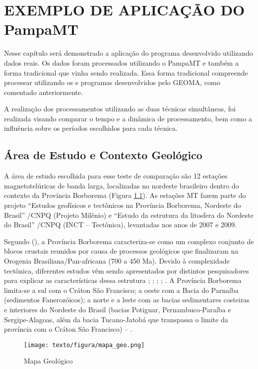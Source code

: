 \chapter{EXEMPLO DE APLICAÇÃO DO {PampaMT}}
    
    Nesse capítulo será demonstrado a aplicação do programa desenvolvido utilizando dados reais. Os dados foram processados utilizando o PampaMT e também a forma tradicional que vinha sendo realizada. Essa forma tradicional compreende processar utilizando os  e programas desenvolvidos pelo GEOMA, como comentado anteriormente.
    
    A realização dos processamentos utilizando as duas técnicas simultâneas, foi realizada visando comparar o tempo e a dinâmica de processamento, bem como a influência sobre os períodos escolhidos para cada técnica.  
    
    \section{Área de Estudo e Contexto Geológico}
        
        A área de estudo escolhida para esse teste de comparação são 12 estações magnetotelúricas de banda larga, localizadas no nordeste brasileiro dentro do contexto da Província Borborema (Figura \ref{local-bor}). As estações MT fazem parte do projeto ``Estudos geofísicos e tectônicos na Província Borborema, Nordeste do Brasil” /CNPQ (Projeto Milênio) e “Estudo da estrutura da litosfera do Nordeste do Brasil” /CNPQ (INCT – Tectônica), levantadas nos anos de 2007 e 2009.
    
    Segundo \citeauthor{almeida} (\citeyear{almeida}), a Província Borborema caracteriza-se como um complexo conjunto de blocos crustais reunidos por causa de processos geológicos que finalizaram na Orogenia Brasiliana/Pan-africana (700 a 450 Ma). Devido à complexidade tectônica, diferentes estudos vêm sendo apresentados por distintos pesquisadores para explicar as características dessa estrutura \cite{van}; \cite{teseandrea}; \cite{santos2014deep}; \cite{padilha}; \cite{barbosa}. A Província Borborema limita-se a sul com o Cráton São Francisco; a oeste com a Bacia do Parnaíba (sedimentos Fanerozóicos); a norte e a leste com as bacias sedimentares costeiras e interiores do Nordeste do Brasil (bacias Potiguar, Pernambuco-Paraíba e Sergipe-Alagoas, além da bacia Tucano-Jatobá que transpassa o limite da província com o Cráton São Francisco) -- \cite{medeiros}.    
    
    \begin{figure}[h]
        \caption{Mapa Geológico}
            \begin{center}
                \texttt{[image: texto/figura/mapa\_geo.png]}
            \end{center}
        \label{local-bor}
    \end{figure}
        
